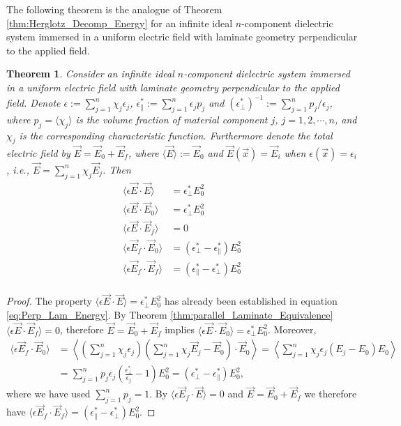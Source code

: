 \documentclass[english,12pt]{ttuthes}
\newtheorem{theorem}{Theorem}[chapter]
\begin{document}
The following theorem is the analogue of Theorem
\ref{thm:Herglotz_Decomp_Energy} for an infinite ideal $n$-component 
dielectric system immersed in a uniform electric field with laminate
geometry perpendicular to the applied field. 
%
\begin{theorem}
%  
Consider an infinite ideal $n$-component dielectric system immersed
in a uniform electric field with laminate geometry perpendicular to
the applied field. Denote $\epsilon:=\sum_{j=1}^n \chi_j\epsilon_j$,
$\epsilon^*_\parallel:=\sum_{j=1}^n\epsilon_jp_j$ and $(\epsilon^*_\perp)^{-1}:=\sum_{j=1}^n p_j/\epsilon_j$, where
$p_j=\langle\chi_j\rangle$ is the volume fraction of material component $j$,
$j=1,2,\cdots,n$, and $\chi_j$ is the corresponding characteristic
function. Furthermore denote the total electric field by
$\vec{E}=\vec{E}_0+\vec{E}_f$, where $\langle\vec{E}\rangle:=\vec{E}_0$ and
$\vec{E}(\vec{x})=\vec{E}_i$ when $\epsilon(\vec{x})=\epsilon_i$, i.e.,
$\vec{E}=\sum_{j=1}^n\chi_j\vec{E}_j$. Then 
\begin{align*}
  \langle\epsilon\vec{E}\cdot\vec{E}\rangle&=\epsilon^*_\perp E_0^2\\
  \langle\epsilon\vec{E}\cdot\vec{E}_0\rangle&=\epsilon^*_\perp E_0^2\\
  \langle\epsilon\vec{E}\cdot\vec{E}_f\rangle&=0\\
  \langle\epsilon\vec{E}_f\cdot\vec{E}_0\rangle&=(\epsilon^*_\perp-\epsilon^*_\parallel)E_0^2\\
  \langle\epsilon\vec{E}_f\cdot\vec{E}_f\rangle&=(\epsilon^*_\parallel-\epsilon^*_\perp)E_0^2\\
\end{align*}
%
\end{theorem}
%
\begin{proof}  
   The property $\langle\epsilon\vec{E}\cdot\vec{E}\rangle=\epsilon^*_\perp E_0^2$ has already been
   established in equation \eqref{eq:Perp_Lam_Energy}. By Theorem
   \ref{thm:parallel_Laminate_Equivalence} $\langle\epsilon\vec{E}\cdot\vec{E}_f\rangle=0$,
   therefore $\vec{E}=\vec{E}_0+\vec{E}_f$ implies
   $\langle\epsilon\vec{E}\cdot\vec{E}_0\rangle=\epsilon^*_\perp E_0^2$. Moreover,  
%  
  \begin{align*}
     \langle\epsilon\vec{E}_f\cdot\vec{E}_0\rangle&=\left\langle\left(\sum_{j=1}^n\chi_j\epsilon_j\right)
                           \left(\sum_{j=1}^n\chi_j\vec{E}_j-\vec{E}_0\right)\cdot\vec{E}_0
                         \right\rangle
                     =\left\langle\sum_{j=1}^n\chi_j\epsilon_j(E_j-E_0)E_0\right\rangle\\
                     &=\sum_{j=1}^np_j\epsilon_j\left(\frac{\epsilon^*_\perp}{\epsilon_j}-1\right)E_0^2
                     =(\epsilon^*_\perp-\epsilon^*_\parallel)E_0^2,
   \end{align*}
%
   where we have used $\sum_{j=1}^np_j=1$. By $ \langle\epsilon\vec{E}_f\cdot\vec{E}\rangle=0$
   and $\vec{E}=\vec{E}_0+\vec{E}_f$ we therefore have
   $\langle\epsilon\vec{E}_f\cdot\vec{E}_f\rangle=(\epsilon^*_\parallel-\epsilon^*_\perp)E_0^2$. 
\end{proof}
%
%
\end{document}
